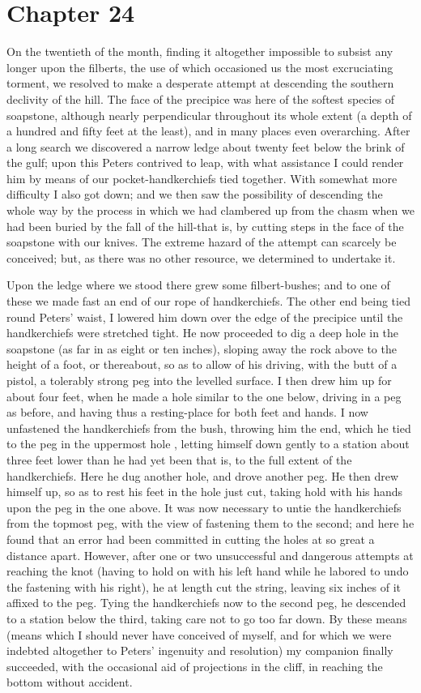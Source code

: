 \section{Chapter 24}
On the twentieth of the month, finding it altogether impossible to subsist
any longer upon the filberts, the use of which occasioned us the most
excruciating torment, we resolved to make a desperate attempt at descending the
southern declivity of the hill. The face of the precipice was here of the
softest species of soapstone, although nearly perpendicular throughout its whole
extent (a depth of a hundred and fifty feet at the least), and in many places
even overarching. After a long search we discovered a narrow ledge about twenty
feet below the brink of the gulf; upon this Peters contrived to leap, with what
assistance I could render him by means of our pocket-handkerchiefs tied
together. With somewhat more difficulty I also got down; and we then saw the
possibility of descending the whole way by the process in which we had clambered
up from the chasm when we had been buried by the fall of the hill-that is, by
cutting steps in the face of the soapstone with our knives. The extreme hazard
of the attempt can scarcely be conceived; but, as there was no other resource,
we determined to undertake it. 

Upon the ledge where we stood there grew some filbert-bushes; and to one of
these we made fast an end of our rope of handkerchiefs. The other end being tied
round Peters' waist, I lowered him down over the edge of the precipice until the
handkerchiefs were stretched tight. He now proceeded to dig a deep hole in the
soapstone (as far in as eight or ten inches), sloping away the rock above to the
height of a foot, or thereabout, so as to allow of his driving, with the butt of
a pistol, a tolerably strong peg into the levelled surface. I then drew him up
for about four feet, when he made a hole similar to the one below, driving in a
peg as before, and having thus a resting-place for both feet and hands. I now
unfastened the handkerchiefs from the bush, throwing him the end, which he tied
to the peg in the uppermost hole , letting himself down gently to a station
about three feet lower than he had yet been that is, to the full extent of the
handkerchiefs. Here he dug another hole, and drove another peg. He then drew
himself up, so as to rest his feet in the hole just cut, taking hold with his
hands upon the peg in the one above. It was now necessary to untie the
handkerchiefs from the topmost peg, with the view of fastening them to the
second; and here he found that an error had been committed in cutting the holes
at so great a distance apart. However, after one or two unsuccessful and
dangerous attempts at reaching the knot (having to hold on with his left hand
while he labored to undo the fastening with his right), he at length cut the
string, leaving six inches of it affixed to the peg. Tying the handkerchiefs now
to the second peg, he descended to a station below the third, taking care not to
go too far down. By these means (means which I should never have conceived of
myself, and for which we were indebted altogether to Peters' ingenuity and
resolution) my companion finally succeeded, with the occasional aid of
projections in the cliff, in reaching the bottom without accident. 

